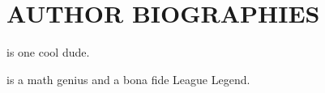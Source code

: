 \section*{AUTHOR BIOGRAPHIES}

 is one cool dude.

 is a math genius and a bona fide League Legend.

